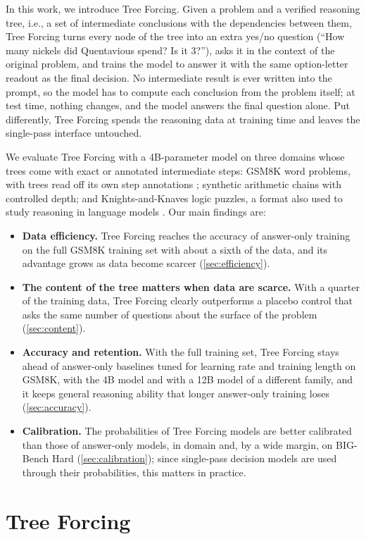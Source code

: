 \documentclass{article}
\newcommand{\tf}{Tree Forcing}
\begin{document}
In this work, we introduce \tf{}. Given a problem and a verified reasoning tree, i.e., a set of intermediate
conclusions with the dependencies between them, \tf{} turns every node of the tree into an extra yes/no question
(``How many nickels did Quentavious spend? Is it 3?''), asks it in the context of the original problem, and trains the
model to answer it with the same option-letter readout as the final decision. No intermediate result is ever written
into the prompt, so the model has to compute each conclusion from the problem itself; at test time, nothing changes,
and the model answers the final question alone. Put differently, \tf{} spends the reasoning data at training time and
leaves the single-pass interface untouched.

We evaluate \tf{} with a 4B-parameter model on three domains whose trees come with exact or annotated intermediate
steps: GSM8K word problems, with trees read off its own step annotations \citep{cobbe2021gsm8k}; synthetic arithmetic
chains with controlled depth; and Knights-and-Knaves logic puzzles, a format also used to study reasoning in
language models \citep{xie2024kk}. Our main findings are:
\begin{itemize}
  \item \textbf{Data efficiency.} \tf{} reaches the accuracy of answer-only training on the full GSM8K training set
  with about a sixth of the data, and its advantage grows as data become scarcer (\cref{sec:efficiency}).
  \item \textbf{The content of the tree matters when data are scarce.} With a quarter of the training data, \tf{}
  clearly outperforms a placebo control that asks the same number of questions about the surface of the problem
  (\cref{sec:content}).
  \item \textbf{Accuracy and retention.} With the full training set, \tf{} stays ahead of answer-only baselines tuned
  for learning rate and training length on GSM8K, with the 4B model and with a 12B model of a different family, and it
  keeps general reasoning ability that longer answer-only training loses (\cref{sec:accuracy}).
  \item \textbf{Calibration.} The probabilities of \tf{} models are better calibrated than those of answer-only models,
  in domain and, by a wide margin, on BIG-Bench Hard (\cref{sec:calibration}); since single-pass decision models are
  used through their probabilities, this matters in practice.
\end{itemize}

\section{Tree Forcing}
\label{sec:method}
\end{document}
